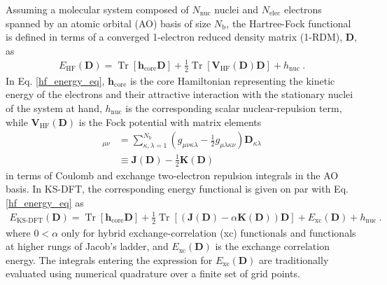 \documentclass[journal=jctc,manuscript=article]{achemso}
\DeclareMathOperator{\tr}{Tr}
\begin{document}
Assuming a molecular system composed of $N_{\text{nuc}}$ nuclei and $N_{\text{elec}}$ electrons spanned by an atomic orbital (AO) basis of size $N_{\text{b}}$, the Hartree-Fock functional is defined in terms of a converged 1-electron reduced density matrix (1-RDM), $\bm{D}$, as~\cite{mest}
%
\begin{align}
E_{\text{HF}}(\bm{D}) = \tr[\bm{h}_{\text{core}}\bm{D}] + \tfrac{1}{2}\tr[\bm{V}_{\text{HF}}(\bm{D})\bm{D}] + h_{\text{nuc}} \ . \label{hf_energy_eq}
\end{align}
%
In Eq. \ref{hf_energy_eq}, $\bm{h}_{\text{core}}$ is the core Hamiltonian representing the kinetic energy of the electrons and their attractive interaction with the stationary nuclei of the system at hand, $h_{\text{nuc}}$ is the corresponding scalar nuclear-repulsion term, while $\bm{V}_{\text{HF}}(\bm{D})$ is the Fock potential with matrix elements
%
\begin{align}
[\bm{V}_{\text{HF}}(\bm{D})]_{\mu\nu} &= \sum^{N_{\text{b}}}_{\kappa,\lambda=1}(g_{\mu\nu\kappa\lambda} - \tfrac{1}{2}g_{\mu\lambda\kappa\nu})\bm{D}_{\kappa\lambda} \nonumber \\
&\equiv \bm{J}(\bm{D}) - \tfrac{1}{2}\bm{K}(\bm{D}) \label{fock_potential_eq}
\end{align}
%
in terms of Coulomb and exchange two-electron repulsion integrals in the AO basis. In KS-DFT, the corresponding energy functional is given on par with Eq. \ref{hf_energy_eq} as
%
\begin{align}
E_{\text{KS-DFT}}(\bm{D}) = \tr[\bm{h}_{\text{core}}\bm{D}] + \tfrac{1}{2}\tr[(\bm{J}(\bm{D}) - \alpha\bm{K}(\bm{D}))\bm{D}] + E_{\text{xc}}(\bm{D}) + h_{\text{nuc}} \ . \label{ks_dft_energy_eq}
\end{align}
%
where $0 < \alpha$ only for hybrid exchange-correlation (xc) functionals and functionals at higher rungs of Jacob's ladder, and $E_{\text{xc}}(\bm{D})$ is the exchange correlation energy. The integrals entering the expression for $E_{\text{xc}}(\bm{D})$ are traditionally evaluated using numerical quadrature over a finite set of grid points.\\
\end{document}

